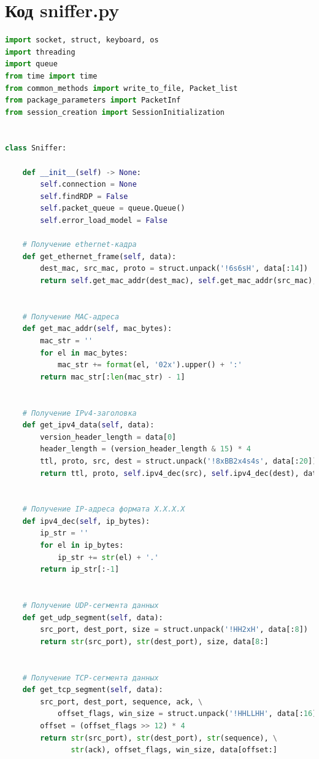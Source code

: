 \documentclass[bachelor, och, coursework]{SCWorks}
\begin{document}
  \appendix

    \section{Код sniffer.py}

    \begin{lstlisting}[language=Python]
import socket, struct, keyboard, os
import threading
import queue
from time import time
from common_methods import write_to_file, Packet_list
from package_parameters import PacketInf
from session_creation import SessionInitialization


class Sniffer:

    def __init__(self) -> None:
        self.connection = None
        self.findRDP = False
        self.packet_queue = queue.Queue()
        self.error_load_model = False

    # Получение ethernet-кадра
    def get_ethernet_frame(self, data):
        dest_mac, src_mac, proto = struct.unpack('!6s6sH', data[:14])
        return self.get_mac_addr(dest_mac), self.get_mac_addr(src_mac), socket.htons(proto)


    # Получение MAC-адреса
    def get_mac_addr(self, mac_bytes):
        mac_str = ''
        for el in mac_bytes:
            mac_str += format(el, '02x').upper() + ':'
        return mac_str[:len(mac_str) - 1]


    # Получение IPv4-заголовка
    def get_ipv4_data(self, data):
        version_header_length = data[0]
        header_length = (version_header_length & 15) * 4
        ttl, proto, src, dest = struct.unpack('!8xBB2x4s4s', data[:20])
        return ttl, proto, self.ipv4_dec(src), self.ipv4_dec(dest), data[header_length:]


    # Получение IP-адреса формата X.X.X.X
    def ipv4_dec(self, ip_bytes):
        ip_str = ''
        for el in ip_bytes:
            ip_str += str(el) + '.'
        return ip_str[:-1]


    # Получение UDP-сегмента данных
    def get_udp_segment(self, data):
        src_port, dest_port, size = struct.unpack('!HH2xH', data[:8])
        return str(src_port), str(dest_port), size, data[8:]


    # Получение TCP-cегмента данных
    def get_tcp_segment(self, data):
        src_port, dest_port, sequence, ack, \
            offset_flags, win_size = struct.unpack('!HHLLHH', data[:16])
        offset = (offset_flags >> 12) * 4
        return str(src_port), str(dest_port), str(sequence), \
               str(ack), offset_flags, win_size, data[offset:]



\end{lstlisting}
\end{document}
